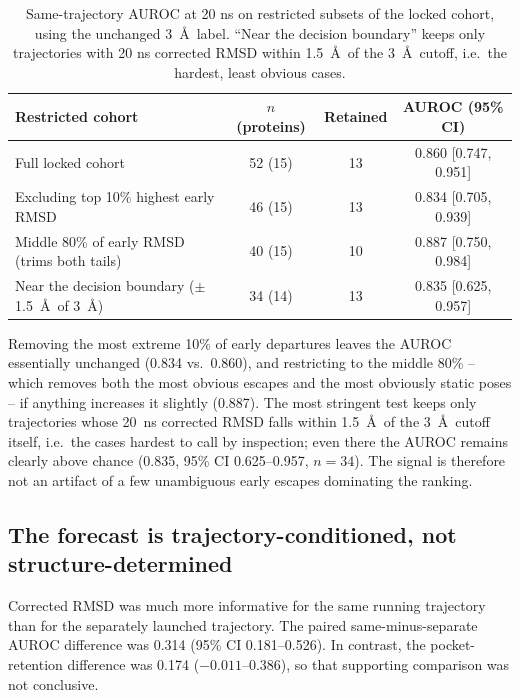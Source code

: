 \documentclass[11pt]{article}
\begin{document}
\begin{table}[htbp]
\centering
\caption{Same-trajectory AUROC at 20 ns on restricted subsets of the locked cohort, using the unchanged 3~\AA\ label. ``Near the decision boundary'' keeps only trajectories with 20 ns corrected RMSD within 1.5~\AA\ of the 3~\AA\ cutoff, i.e.\ the hardest, least obvious cases.}
\label{tab:non-obvious}
\begin{tabular}{lccc}
\toprule
Restricted cohort & $n$ (proteins) & Retained & AUROC (95\% CI) \\
\midrule
Full locked cohort & 52 (15) & 13 & 0.860 [0.747, 0.951] \\
Excluding top 10\% highest early RMSD & 46 (15) & 13 & 0.834 [0.705, 0.939] \\
Middle 80\% of early RMSD (trims both tails) & 40 (15) & 10 & 0.887 [0.750, 0.984] \\
Near the decision boundary ($\pm$1.5~\AA\ of 3~\AA) & 34 (14) & 13 & 0.835 [0.625, 0.957] \\
\bottomrule
\end{tabular}
\end{table}

Removing the most extreme 10\% of early departures leaves the AUROC essentially unchanged (0.834 vs.\ 0.860), and restricting to the middle 80\% -- which removes both the most obvious escapes and the most obviously static poses -- if anything increases it slightly (0.887). The most stringent test keeps only trajectories whose 20~ns corrected RMSD falls within 1.5~\AA\ of the 3~\AA\ cutoff itself, i.e.\ the cases hardest to call by inspection; even there the AUROC remains clearly above chance (0.835, 95\% CI 0.625--0.957, $n=34$). The signal is therefore not an artifact of a few unambiguous early escapes dominating the ranking.

\subsection{The forecast is trajectory-conditioned, not structure-determined}

Corrected RMSD was much more informative for the same running trajectory than for the separately launched trajectory. The paired same-minus-separate AUROC difference was 0.314 (95\% CI 0.181--0.526). In contrast, the pocket-retention difference was 0.174 ($-0.011$--0.386), so that supporting comparison was not conclusive.
\end{document}
